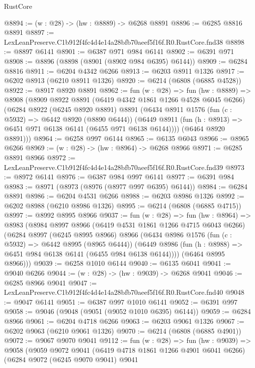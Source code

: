 \begin{lexlean}{RustCore}
\begin{coremodule}
@8894 := (w : @28) -> (hw : @8889) -> @6268 @8891
@8896 := @6285 @8816 @8891
@8897 := LexLeanPreserve.C1b912f4fc4d4e14a28bfb70aeef5f16f.R0.RustCore.fnd38
@8898 := @8897 @6141
@8901 := @6387 @971 @984 @6141
@8902 := @6391 @971
@8908 := @8896 (@8898 (@8901 (@8902 @984 @6395) @6144))
@8909 := @6284 @8816
@8911 := @6204 @4342 @6266
@8913 := @6203 @8911 @1326
@8917 := @6202 @8913 (@6210 @8911 @1326)
@8920 := @6214 (@6808 (@6885 @4528))
@8922 := @8917 @8920 @8891
@8962 := fun (w : @28) =>
  fun (hw : @8889) =>
  @8908
    (@8909
      @8922
      @8891
      (@6419 @4342 @1861 @1266 @4528 @6045 @6266)
      (@6284
        @8922
        (@6245 @8920 @8891)
        @8891
        (@6434
          @8911
          @1576
          (fun (c : @5932) => @6442 @8920 (@8890 @6444))
          (@6449 @8911 (fun (h : @8913) => @6451 @971 @6138 @6141 (@6455 @971 @6138 @6144))))
        (@6464 @8920 @8891)))
@8964 := @6258 @997 @6144
@8965 := @6135 @6043
@8966 := @8965 @6266
@8969 := (w : @28) -> (hw : @8964) -> @6268 @8966
@8971 := @6285 @8891 @8966
@8972 := LexLeanPreserve.C1b912f4fc4d4e14a28bfb70aeef5f16f.R0.RustCore.fnd39
@8973 := @8972 @6141
@8976 := @6387 @984 @997 @6141
@8977 := @6391 @984
@8983 := @8971 (@8973 (@8976 (@8977 @997 @6395) @6144))
@8984 := @6284 @8891
@8986 := @6204 @4531 @6266
@8988 := @6203 @8986 @1326
@8992 := @6202 @8988 (@6210 @8986 @1326)
@8995 := @6214 (@6808 (@6885 @4715))
@8997 := @8992 @8995 @8966
@9037 := fun (w : @28) =>
  fun (hw : @8964) =>
  @8983
    (@8984
      @8997
      @8966
      (@6419 @4531 @1861 @1266 @4715 @6043 @6266)
      (@6284
        @8997
        (@6245 @8995 @8966)
        @8966
        (@6434
          @8986
          @1576
          (fun (c : @5932) => @6442 @8995 (@8965 @6444))
          (@6449 @8986 (fun (h : @8988) => @6451 @984 @6138 @6141 (@6455 @984 @6138 @6144))))
        (@6464 @8995 @8966)))
@9039 := @6258 @1010 @6144
@9040 := @6135 @6041
@9041 := @9040 @6266
@9044 := (w : @28) -> (hw : @9039) -> @6268 @9041
@9046 := @6285 @8966 @9041
@9047 := LexLeanPreserve.C1b912f4fc4d4e14a28bfb70aeef5f16f.R0.RustCore.fnd40
@9048 := @9047 @6141
@9051 := @6387 @997 @1010 @6141
@9052 := @6391 @997
@9058 := @9046 (@9048 (@9051 (@9052 @1010 @6395) @6144))
@9059 := @6284 @8966
@9061 := @6204 @4718 @6266
@9063 := @6203 @9061 @1326
@9067 := @6202 @9063 (@6210 @9061 @1326)
@9070 := @6214 (@6808 (@6885 @4901))
@9072 := @9067 @9070 @9041
@9112 := fun (w : @28) =>
  fun (hw : @9039) =>
  @9058
    (@9059
      @9072
      @9041
      (@6419 @4718 @1861 @1266 @4901 @6041 @6266)
      (@6284
        @9072
        (@6245 @9070 @9041)
        @9041

\end{coremodule}
\end{lexlean}
